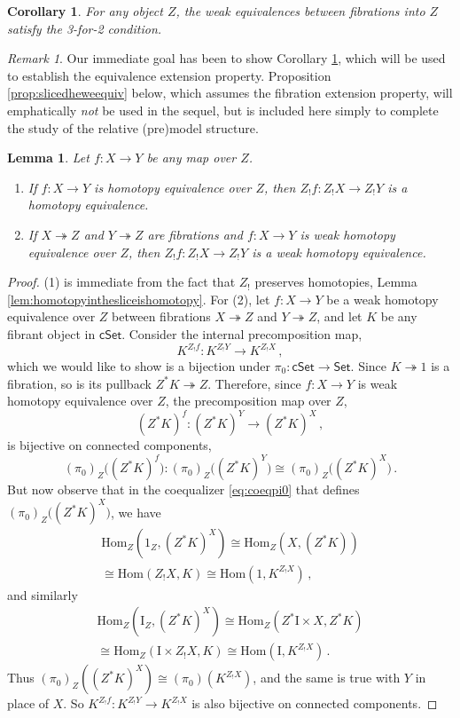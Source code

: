 \documentclass[11pt,reqno]{amsart}
\newcommand{\Set}{\ensuremath{\mathsf{Set}}}
\newcommand{\cSet}{\ensuremath{\mathsf{cSet}}}
\newcommand{\fib}{\ensuremath{\twoheadrightarrow}}
\renewcommand{\to}{\ensuremath{\rightarrow}}
\newcommand{\Hom}{\ensuremath{\mathrm{Hom}}}
\newcommand{\I}{\ensuremath{\mathrm{I}}}
\newtheorem{lemma}[theorem]{Lemma}
\newtheorem{corollary}[theorem]{Corollary}
\theoremstyle{remark}
\newtheorem{remark}[theorem]{Remark}
\theoremstyle{definition}
\begin{document}
\begin{corollary}\label{cor:342weqfiboverZ}
For any object $Z$, the weak equivalences between fibrations into $Z$ satisfy the 3-for-2 condition.
\end{corollary}

\begin{remark}\label{remark:relativepremodelneeds342}
Our immediate goal has been to show Corollary \ref{cor:342weqfiboverZ}, which will be used to establish the equivalence extension property.  Proposition \ref{prop:slicedheweequiv} below, which assumes the fibration extension property, will emphatically \emph{not} be used in the sequel, but is included here simply to complete the study of the relative (pre)model structure.
\end{remark}


\begin{lemma}\label{lemma:heovertohe}
Let $f : X\to Y$ be any map over $Z$. 
\begin{enumerate}
\item If $f : X\to Y$ is homotopy equivalence over $Z$, then $Z_!f : Z_! X \to Z_! Y$ is a homotopy equivalence.
\item If $X\fib Z$ and $Y\fib Z$ are fibrations and $f : X\to Y$ is weak homotopy equivalence over $Z$, then $Z_!f : Z_! X \to Z_! Y$ is a weak homotopy equivalence.
\end{enumerate}
\end{lemma}
%
\begin{proof}
(1) is immediate from the fact that $Z_!$ preserves homotopies, Lemma \ref{lem:homotopyinthesliceishomotopy}.
For (2), let $f : X\to Y$ be a weak homotopy equivalence over $Z$ between fibrations $X\fib Z$ and $Y\fib Z$, and let $K$ be any fibrant object in $\cSet$.  
Consider the internal precomposition map, 
\[
K^{Z_!f} : K^{Z_! Y} \to K^{Z_! X}\,,
\]
which we would like to show is a bijection under $\pi_0 : \cSet \to \Set$.
Since $K\fib1$ is a fibration, so is its pullback $Z^*K \fib Z$.  Therefore, since $f : X\to Y$ is weak homotopy equivalence over $Z$, 
the precomposition map over $Z$,
\[
(Z^*K)^f : (Z^*K)^Y \to (Z^*K)^X\,,
\]
is bijective on connected components, 
\[
(\pi_0)_Z\big((Z^*K)^f\big) : (\pi_0)_Z\big((Z^*K)^Y\big) \cong (\pi_0)_Z\big((Z^*K)^X\big)\,.
\]
But now observe that in the coequalizer \eqref{eq:coeqpi0} that defines $(\pi_0)_Z\big((Z^*K)^X\big)$, we have 
\[\begin{split}
\Hom_Z(1_Z , (Z^*K)^X) \cong  \Hom_Z(X, (Z^*K))\\
 \cong \Hom(Z_!X, K)  \cong \Hom(1, K^{Z_!X})\,,
\end{split}\]
and similarly 
\[\begin{split}
\Hom_Z(\I_Z , (Z^*K)^X) \cong  \Hom_Z(Z^*\I \times X, Z^*K) \\
 \cong \Hom_Z(\I \times Z_! X, K) \cong \Hom(\I, K^{Z_!X})\,.
\end{split}\]
Thus $(\pi_0)_Z((Z^*K)^X) \cong (\pi_0)(K^{Z_!X})$, and the same is true with $Y$ in place of $X$.   So  $K^{Z_!f} : K^{Z_!Y} \to K^{Z_!X}$ is also bijective on connected components.
\end{proof}
\end{document}
